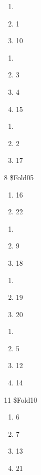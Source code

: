 \documentclass[
  letterpaper,
  DIV=11,
  numbers=noendperiod]{scrreprt}
\providecommand{\tightlist}{%
  \setlength{\itemsep}{0pt}\setlength{\parskip}{0pt}}\usepackage{longtable,booktabs,array}
\begin{document}
\begin{description}
\tightlist
\item[\$Fold01]
\begin{enumerate}
\def\labelenumi{\arabic{enumi}.}
\tightlist
\item[]
\item
  1
\item
  10
\end{enumerate}
\item[\$Fold02]
\begin{enumerate}
\def\labelenumi{\arabic{enumi}.}
\tightlist
\item[]
\item
  3
\item
  4
\item
  15
\end{enumerate}
\item[\$Fold03]
\begin{enumerate}
\def\labelenumi{\arabic{enumi}.}
\tightlist
\item[]
\item
  2
\item
  17
\end{enumerate}
\item[\$Fold04]
8 \$Fold05

\begin{enumerate}
\def\labelenumi{\arabic{enumi}.}
\tightlist
\item
  16
\item
  22
\end{enumerate}
\item[\$Fold06]
\begin{enumerate}
\def\labelenumi{\arabic{enumi}.}
\tightlist
\item[]
\item
  9
\item
  18
\end{enumerate}
\item[\$Fold07]
\begin{enumerate}
\def\labelenumi{\arabic{enumi}.}
\tightlist
\item[]
\item
  19
\item
  20
\end{enumerate}
\item[\$Fold08]
\begin{enumerate}
\def\labelenumi{\arabic{enumi}.}
\tightlist
\item[]
\item
  5
\item
  12
\item
  14
\end{enumerate}
\item[\$Fold09]
11 \$Fold10

\begin{enumerate}
\def\labelenumi{\arabic{enumi}.}
\tightlist
\item
  6
\item
  7
\item
  13
\item
  21
\end{enumerate}
\end{description}
\end{document}
